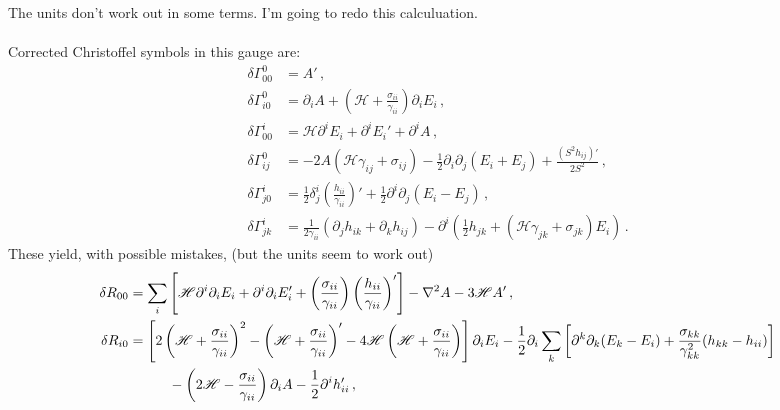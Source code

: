 \documentclass{article}
\newcommand*\scr[1]{\mathscr{#1}}
\newcommand*\p[1]{\left(#1\right)}
\newcommand*\ps[1]{\left[#1\right]}
\newcommand*\f[2]{\frac{#1}{#2}}
\begin{document}
The units don't work out in some terms. I'm going to redo this calculuation.
\\\\
Corrected Christoffel symbols in this gauge are:
\begin{align}
\delta\Gamma^0_{00}&=A'\,,\\
\delta\Gamma^0_{i0}&=\partial_i A+\p{\scr H+\f{\sigma_{ii}}{\gamma_{ii}}}\partial_i E_i\,,\\
\delta\Gamma^i_{00}&=\scr H\partial^i E_i+\partial^i E_i'+\partial^i A\,,\\
\delta\Gamma^0_{ij}&=-2A(\scr H\gamma_{ij}+\sigma_{ij})-\f12\partial_i\partial_j(E_i+E_j)+\f{(S^2 h_{ij})'}{2S^2}\,,\\
\delta\Gamma^i_{j0}&=\f12\delta^i_j\p{\f{h_{ii}}{\gamma_{ii}}}'+\f12\partial^i\partial_j(E_i-E_j)\,,\\
\delta\Gamma^i_{jk}&=\f1{2\gamma_{ii}}\p{\partial_j h_{ik}+\partial_k h_{ij}}-\partial^i\p{\f12h_{jk}+\p{\scr H\gamma_{jk}+\sigma_{jk}}E_i}\,.
\end{align}
These yield, with possible mistakes, (but the units seem to work out)
\begin{align}
\delta R_{00}&=\sum_i\ps{\scr H\partial^i\partial_iE_i+\partial^i\partial_iE_i'+\p{\f{\sigma_{ii}}{\gamma_{ii}}}\p{\f{h_{ii}}{\gamma_{ii}}}'}-\nabla^2 A-3\scr H A'\,,\\
\notag\delta R_{i0}&=\ps{2\p{\scr H+\f{\sigma_{ii}}{\gamma_{ii}}}^2-\p{\scr H+\f{\sigma_{ii}}{\gamma_{ii}}}'-4\scr H\p{\scr H+\f{\sigma_{ii}}{\gamma_{ii}}}}\partial_i E_i-\f12\partial_i\sum_k\ps{\partial^k\partial_k(E_k-E_i)+\f{\sigma_{kk}}{\gamma_{kk}^2}(h_{kk}-h_{ii})}\\&\hspace{1cm}-\p{2\scr H-\f{\sigma_{ii}}{\gamma_{ii}}}\partial_i A-\f12\partial^ih_{ii}'\,,
\end{align}
\end{document}
